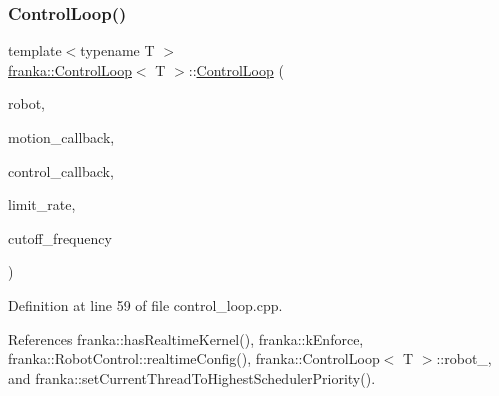\subsubsection{\texorpdfstring{Control\+Loop()}{ControlLoop()}\hspace{0.1cm}{\footnotesize\ttfamily [3/3]}}
{\footnotesize\ttfamily template$<$typename T $>$ \\
\hyperlink{classfranka_1_1ControlLoop}{franka\+::\+Control\+Loop}$<$ T $>$\+::\hyperlink{classfranka_1_1ControlLoop}{Control\+Loop} (\begin{DoxyParamCaption}\item[{\hyperlink{classfranka_1_1RobotControl}{Robot\+Control} \&}]{robot,  }\item[{\hyperlink{classfranka_1_1ControlLoop_a23624d5a86fe2b206986af4757ba1822}{Motion\+Generator\+Callback}}]{motion\+\_\+callback,  }\item[{\hyperlink{classfranka_1_1ControlLoop_a1b050245c6f2795d491899440f95cec3}{Control\+Callback}}]{control\+\_\+callback,  }\item[{\hyperlink{classbool}{bool}}]{limit\+\_\+rate,  }\item[{double}]{cutoff\+\_\+frequency }\end{DoxyParamCaption})\hspace{0.3cm}{\ttfamily [protected]}}



Definition at line 59 of file control\+\_\+loop.\+cpp.



References franka\+::has\+Realtime\+Kernel(), franka\+::k\+Enforce, franka\+::\+Robot\+Control\+::realtime\+Config(), franka\+::\+Control\+Loop$<$ T $>$\+::robot\+\_\+, and franka\+::set\+Current\+Thread\+To\+Highest\+Scheduler\+Priority().



